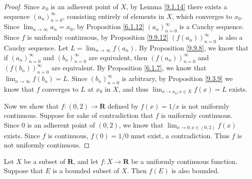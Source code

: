 \begin{proof}
    Since \(x_0\) is an adherent point of \(X\), by Lemma \ref{9.1.14} there exists a sequence \((a_n)_{n = 0}^\infty\), consisting entirely of elements in \(X\), which converges to \(x_0\).
    Since \(\lim_{n \to \infty} a_n = x_0\), by Proposition \ref{6.1.12} \((a_n)_{n = 0}^\infty\) is a Cauchy sequence.
    Since \(f\) is uniformly continuous, by Proposition \ref{9.9.12} \((f(a_n))_{n = 0}^\infty\) is also a Cauchy sequence.
    Let \(L = \lim_{n \to \infty} f(a_n)\).
    By Proposition \ref{9.9.8}, we know that if \((a_n)_{n = 0}^\infty\) and \((b_n)_{n = 0}^\infty\) are equivalent, then \((f(a_n))_{n = 0}^\infty\) and \((f(b_n))_{n = 0}^\infty\) are equivalent.
    By Proposition \ref{6.1.7}, we know that \(\lim_{n \to \infty} f(b_n) = L\).
    Since \((b_n)_{n = 0}^\infty\) is arbitrary, by Proposition \ref{9.3.9} we know that \(f\) converges to \(L\) at \(x_0\) in \(X\), and thus \(\lim_{x \to x_0 ; x \in X} f(x) = L\) exists.

    Now we show that \(f : (0, 2) \to \mathbf{R}\) defined by \(f(x) = 1 / x\) is not uniformly continuous.
    Suppose for sake of contradiction that \(f\) is uniformly continuous.
    Since \(0\) is an adherent point of \((0, 2)\), we know that \(\lim_{x \to 0 ; x \in (0, 2)} f(x)\) exists.
    Since \(f\) is continuous, \(f(0) = 1 / 0\) must exist, a contradiction.
    Thus \(f\) is not uniformly continuous.
\end{proof}

\begin{proposition}\label{9.9.15}
    Let \(X\) be a subset of \(\mathbf{R}\), and let \(f : X \to \mathbf{R}\) be a uniformly continuous function.
    Suppose that \(E\) is a bounded subset of \(X\).
    Then \(f(E)\) is also bounded.
\end{proposition}

